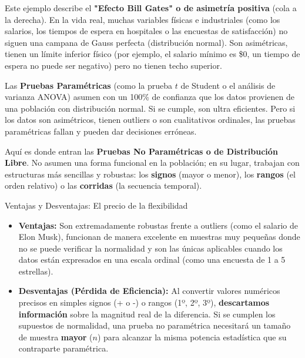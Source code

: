 \documentclass[11pt,a4paper]{article}
\begin{document}
Este ejemplo describe el \textbf{"Efecto Bill Gates" o de asimetría positiva} (cola a la derecha). En la vida real, muchas variables físicas e industriales (como los salarios, los tiempos de espera en hospitales o las encuestas de satisfacción) no siguen una campana de Gauss perfecta (distribución normal). Son asimétricas, tienen un límite inferior físico (por ejemplo, el salario mínimo es \$0, un tiempo de espera no puede ser negativo) pero no tienen techo superior.

Las \textbf{Pruebas Paramétricas} (como la prueba $t$ de Student o el análisis de varianza ANOVA) asumen con un 100\% de confianza que los datos provienen de una población con distribución normal. Si se cumple, son ultra eficientes. Pero si los datos son asimétricos, tienen outliers o son cualitativos ordinales, las pruebas paramétricas fallan y pueden dar decisiones erróneas.

Aquí es donde entran las \textbf{Pruebas No Paramétricas o de Distribución Libre}. No asumen una forma funcional en la población; en su lugar, trabajan con estructuras más sencillas y robustas: los \textbf{signos} (mayor o menor), los \textbf{rangos} (el orden relativo) o las \textbf{corridas} (la secuencia temporal).

\begin{subsection}{Ventajas y Desventajas: El precio de la flexibilidad}
    \begin{itemize}
        \item \textbf{Ventajas:} Son extremadamente robustas frente a outliers (como el salario de Elon Musk), funcionan de manera excelente en muestras muy pequeñas donde no se puede verificar la normalidad y son las únicas aplicables cuando los datos están expresados en una escala ordinal (como una encuesta de 1 a 5 estrellas).
        \item \textbf{Desventajas (Pérdida de Eficiencia):} Al convertir valores numéricos precisos en simples signos (+ o -) o rangos (1º, 2º, 3º), \textbf{descartamos información} sobre la magnitud real de la diferencia. Si se cumplen los supuestos de normalidad, una prueba no paramétrica necesitará un tamaño de muestra \textbf{mayor} ($n$) para alcanzar la misma potencia estadística que su contraparte paramétrica.
    \end{itemize}
\end{subsection}

\newpage
\end{document}
